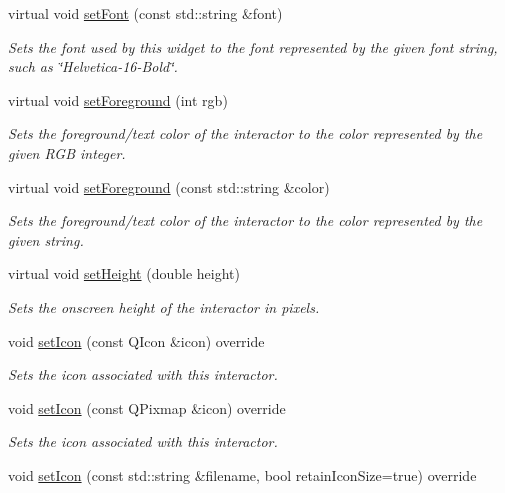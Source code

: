 \begin{DoxyCompactItemize}
virtual void \mbox{\hyperlink{classsgl_1_1GInteractor_a8e096e8818d838aceae1d46d58fb3a7b}{set\+Font}} (const std\+::string \&font)
\begin{DoxyCompactList}\small\item\em Sets the font used by this widget to the font represented by the given font string, such as \char`\"{}\+Helvetica-\/16-\/\+Bold\char`\"{}. \end{DoxyCompactList}\item 
virtual void \mbox{\hyperlink{classsgl_1_1GInteractor_a9eb856b5ff83a19df3831a31f15f4563}{set\+Foreground}} (int rgb)
\begin{DoxyCompactList}\small\item\em Sets the foreground/text color of the interactor to the color represented by the given R\+GB integer. \end{DoxyCompactList}\item 
virtual void \mbox{\hyperlink{classsgl_1_1GInteractor_af59209aeadea6dfc6d97a2d8531f50e1}{set\+Foreground}} (const std\+::string \&color)
\begin{DoxyCompactList}\small\item\em Sets the foreground/text color of the interactor to the color represented by the given string. \end{DoxyCompactList}\item 
virtual void \mbox{\hyperlink{classsgl_1_1GInteractor_a9e280bfc4544dfaf8e4376c4e1a74357}{set\+Height}} (double height)
\begin{DoxyCompactList}\small\item\em Sets the onscreen height of the interactor in pixels. \end{DoxyCompactList}\item 
void \mbox{\hyperlink{classsgl_1_1GButton_acca97b6c6330abded1c80521c9aca3a6}{set\+Icon}} (const Q\+Icon \&icon) override
\begin{DoxyCompactList}\small\item\em Sets the icon associated with this interactor. \end{DoxyCompactList}\item 
void \mbox{\hyperlink{classsgl_1_1GButton_acb5275b880ff622d306f8f33428b4e34}{set\+Icon}} (const Q\+Pixmap \&icon) override
\begin{DoxyCompactList}\small\item\em Sets the icon associated with this interactor. \end{DoxyCompactList}\item 
void \mbox{\hyperlink{classsgl_1_1GButton_abbefcb1f611af273755c7e1cca921497}{set\+Icon}} (const std\+::string \&filename, bool retain\+Icon\+Size=true) override

\end{DoxyCompactItemize}
